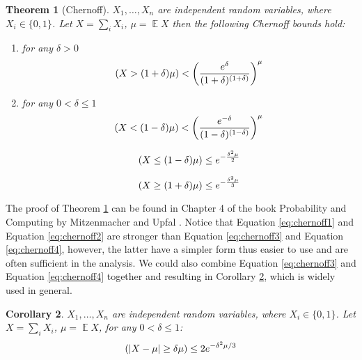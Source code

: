 \documentclass[11pt]{article}
\theoremstyle{plain}
\newtheorem{theorem}{Theorem}[section]
\newtheorem{corollary}[theorem]{Corollary}
\DeclareMathOperator*{\E}{\mathbb{E}}
\let\Pr\relax
\DeclareMathOperator*{\Pr}{\mathbb{P}}
\begin{document}
\begin{theorem}[Chernoff]
\label{th:chernoff}
	$X_1,\ldots, X_n$ are independent random variables, where $X_i\in \{0,1\}$. 
	Let $X=\sum_{i}{X_i}$, $\mu = \E X$ then the following Chernoff bounds 
	hold: 
	\begin{enumerate}
		\item 	for any $\delta>0$
		\begin{equation}
		\label{eq:chernoff1}
		\Pr(X>(1+\delta )\mu )<\left({\frac {e^{\delta }}{(1+\delta )^{(1+\delta 
					)}}}\right)^{\mu }
		\end{equation}
		
		\item 	for any $0<\delta\leq 1$
		\begin{equation}
		\label{eq:chernoff2}
		\Pr(X<(1-\delta )\mu )<\left({\frac {e^{-\delta }}{(1-\delta 
		)^{(1-\delta )}}}\right)^{\mu }
		\end{equation}
		
		\begin{equation}
		\label{eq:chernoff3}
		\Pr(X\leq (1-\delta )\mu )\leq e^{-{\frac {\delta ^{2}\mu }{2}}}
		\end{equation}
		
		\begin{equation}
		\label{eq:chernoff4}
		\Pr(X\geq (1+\delta )\mu )\leq e^{-{\frac {\delta ^{2}\mu }{3}}}
		\end{equation}
			
	\end{enumerate}
\end{theorem}
The proof of Theorem  \ref{th:chernoff} can be found in Chapter 4 of the 
book Probability and Computing by Mitzenmacher and 
Upfal  \cite{MU-probability}. Notice that Equation  \ref{eq:chernoff1} and 
Equation  \ref{eq:chernoff2} are stronger than Equation  \ref{eq:chernoff3} 
and Equation  \ref{eq:chernoff4}, however, the latter have a simpler form 
thus easier to use and are often sufficient in the analysis. We could also 
combine Equation  \ref{eq:chernoff3} and Equation  \ref{eq:chernoff4} 
together and resulting in Corollary  \ref{co:chernoff}, which is widely used in 
general.

\begin{corollary}
\label{co:chernoff}
	$X_1,\ldots, X_n$ are independent random variables, where $X_i\in \{0,1\}$. 
Let $X=\sum_{i}{X_i}$, $\mu = \E X$, for any $0<\delta\leq 1$:
\[
\Pr(|X- \mu| \geq \delta \mu) \leq 2e^{- \delta^2 \mu/3}
\]
\end{corollary}
\end{document}
